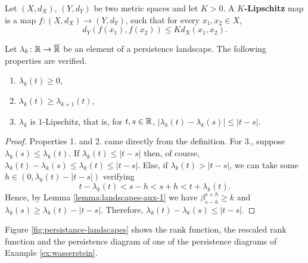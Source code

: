 \begin{definition}[$K$-Lipschitz]
    Let $ (X, d_X) $, $ (Y, d_Y) $ be two metric spaces and let $ K > 0 $. A {\bf $K$-Lipschitz} map is a map $ f \colon (X, d_X) \to (Y, d_Y) $, such that for every $ x_1, x_2 \in X $, 
    \begin{equation}
        d_Y(f(x_1), f(x_2)) \leq K d_X(x_1, x_2).
    \end{equation}
\end{definition}

\begin{lemma} \label{lemma:landscapes-aux-3}
    Let $ \lambda_k \colon \mathbb R \to \overline{\mathbb R} $ be an element of a persistence landscape. The following properties are verified.
    \begin{enumerate}
        \item $\lambda_k(t) \geq 0$,
        \item $\lambda_k(t) \geq \lambda_{k+1}(t)$,
        \item $\lambda_k$ is $1$-Lipschitz, that is, for $ t, s \in \mathbb R $, $ | \lambda_k(t) - \lambda_k(s) | \leq |t-s| $.
    \end{enumerate}
\end{lemma}
\begin{proof}
    Properties 1. and 2. came directly from the definition. For 3., suppose $ \lambda_k(s) \leq \lambda_k(t) $. If $ \lambda_k(t) \leq |t -s | $ then, of course, $ \lambda_k(t) - \lambda_k(s) \leq \lambda_k(t) \leq |t-s| $. Else, if $ \lambda_k(t) >  |t - s | $, we can take some $ h \in (0, \lambda_k(t) -  |t - s |) $ verifying
    \begin{equation}
        t - \lambda_k(t) < s- h < s + h < t + \lambda_k(t).
    \end{equation}
    Hence, by Lemma \ref{lemma:landscapes-aux-1} we have $ \beta_{s-h}^{s+h} \geq k $ and $ \lambda_k(s) \geq \lambda_k(t) - |t -s| $. Therefore, $ \lambda_k(t) - \lambda_k(s) \leq |t-s| $.
\end{proof}

\begin{example}
    Figure \ref{fig:persistance-landscapes} shows the rank function, the rescaled rank function and the persistence diagram of one of the persistence diagrams of Example \ref{ex:wasserstein}.
    
\end{example}

